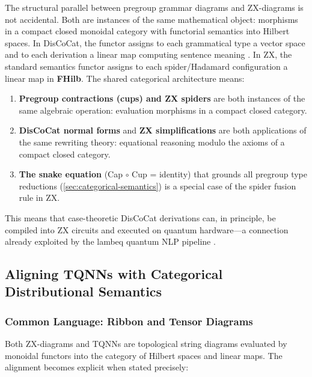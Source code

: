 \documentclass[
]{article}
\providecommand{\tightlist}{%
  \setlength{\itemsep}{0pt}\setlength{\parskip}{0pt}}
\numberwithin{equation}{section}
\begin{document}
The structural parallel between pregroup grammar diagrams and
ZX-diagrams is not accidental. Both are instances of the same
mathematical object: morphisms in a compact closed monoidal category
with functorial semantics into Hilbert spaces. In DisCoCat, the functor
assigns to each grammatical type a vector space and to each derivation a
linear map computing sentence meaning \citep{coecke2010mathematical}. In
ZX, the standard semantics functor assigns to each spider/Hadamard
configuration a linear map in \textbf{FHilb}. The shared categorical
architecture means:

\begin{enumerate}
\def\labelenumi{\arabic{enumi}.}
\tightlist
\item
  \textbf{Pregroup contractions (cups) and ZX spiders} are both
  instances of the same algebraic operation: evaluation morphisms in a
  compact closed category.
\item
  \textbf{DisCoCat normal forms} and \textbf{ZX simplifications} are
  both applications of the same rewriting theory: equational reasoning
  modulo the axioms of a compact closed category.
\item
  \textbf{The snake equation} (Cap \(\circ\) Cup = identity) that
  grounds all pregroup type reductions
  (\autoref{sec:categorical-semantics}) is a special case of the spider
  fusion rule in ZX.
\end{enumerate}

This means that case-theoretic DisCoCat derivations can, in principle,
be compiled into ZX circuits and executed on quantum hardware---a
connection already exploited by the lambeq quantum NLP pipeline
\citep{lorenz2023lambeq}.

\subsection{Aligning TQNNs with Categorical Distributional
Semantics}\label{aligning-tqnns-with-categorical-distributional-semantics}

\subsubsection{Common Language: Ribbon and Tensor
Diagrams}\label{common-language-ribbon-and-tensor-diagrams}

Both ZX-diagrams and TQNNs are topological string diagrams evaluated by
monoidal functors into the category of Hilbert spaces and linear maps.
The alignment becomes explicit when stated precisely:
\end{document}
